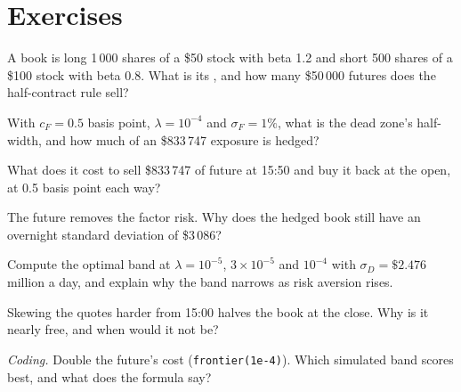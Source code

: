 \section{Exercises}

\begin{exercise}[$\star$]\label{exo:hf:hedging-and-inventory-in-practice:1}
A book is long 1\,000 shares of a \$50 stock with beta 1.2 and short 500 shares of a \$100 stock with beta 0.8. What is its ,
and how many \$50\,000 futures does the half-contract rule sell?
\end{exercise}

\begin{exercise}[$\star$]\label{exo:hf:hedging-and-inventory-in-practice:2}
With $c_F=0.5$ basis point, $\lambda=10^{-4}$ and $\sigma_F=1\%$, what is the dead zone's half-width, and how much of an \$833\,747 exposure is hedged?
\end{exercise}

\begin{exercise}[$\star$]\label{exo:hf:hedging-and-inventory-in-practice:3}
What does it cost to sell \$833\,747 of future at 15:50 and buy it back at the open, at 0.5 basis point each way?
\end{exercise}

\begin{exercise}[$\star\star$]\label{exo:hf:hedging-and-inventory-in-practice:4}
The future removes the factor risk. Why does the hedged book still have an overnight standard deviation of \$3\,086?
\end{exercise}

\begin{exercise}[$\star\star$]\label{exo:hf:hedging-and-inventory-in-practice:5}
Compute the optimal band at $\lambda=10^{-5}$, $3\times10^{-5}$ and $10^{-4}$ with $\sigma_D=\$2.476$ million a day, and explain why the band
narrows as risk aversion rises.
\end{exercise}

\begin{exercise}[$\star\star$]\label{exo:hf:hedging-and-inventory-in-practice:6}
Skewing the quotes harder from 15:00 halves the book at the close. Why is it nearly free, and when would it not be?
\end{exercise}

\begin{exercise}[$\star\star\star$]\label{exo:hf:hedging-and-inventory-in-practice:7}
\emph{Coding.} Double the future's cost (\texttt{frontier(1e-4)}). Which simulated band scores best, and what does the formula say?
\end{exercise}

